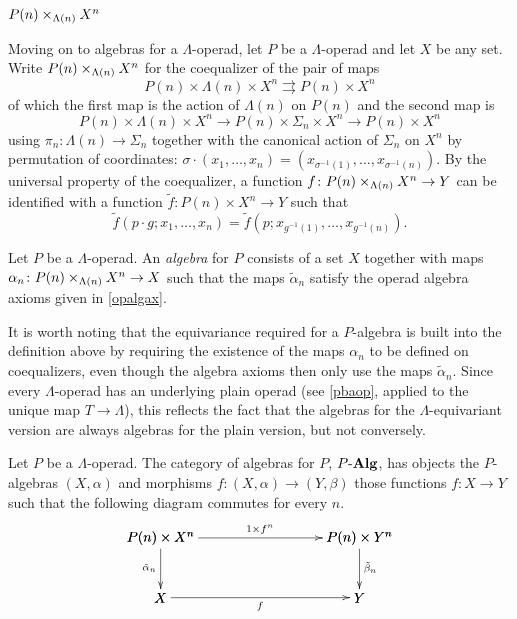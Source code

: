 $P(n) \times_{\Lambda(n)} X^{n}$

Moving on to algebras for a $\Lambda$-operad, let $P$ be a $\Lambda$-operad and let $X$ be any set. Write $P(n) \times_{\Lambda(n)} X^{n}$ for the coequalizer of the pair of maps
  \[
    P(n) \times \Lambda(n) \times X^{n} \rightrightarrows P(n) \times X^{n}
  \]
of which the first map is the action of $\Lambda(n)$ on $P(n)$ and the second map is
  \[
    P(n) \times \Lambda(n) \times X^{n} \rightarrow P(n) \times \Sigma_{n} \times X^{n} \rightarrow P(n) \times X^{n}
  \]
using $\pi_{n} \colon \Lambda(n) \rightarrow \Sigma_{n}$ together with the canonical action of $\Sigma_{n}$ on $X^{n}$ by permutation of coordinates: $\sigma \cdot (x_{1}, \ldots, x_{n}) = (x_{\sigma^{-1}(1)}, \ldots, x_{\sigma^{-1}(n)})$. By the universal property of the coequalizer, a function $f \colon P(n) \times_{\Lambda(n)} X^{n} \rightarrow Y$ can be identified with a function $\tilde{f} \colon P(n) \times X^{n} \rightarrow Y$ such that
  \[
    \tilde{f}(p\cdot g; x_{1}, \ldots, x_{n}) = \tilde{f}\left(p; x_{g^{-1}(1)}, \ldots, x_{g^{-1}(n)}\right).
  \]

\begin{Defi}
  Let $P$ be a $\Lambda$-operad. An \textit{algebra} for $P$ consists of a set $X$ together with maps $\alpha_{n} \colon P(n) \times_{\Lambda(n)} X^{n} \rightarrow X$ such that the maps $\tilde{\alpha}_{n}$ satisfy the operad algebra axioms given in \cref{opalgax}.
\end{Defi}

\begin{rem}
It is worth noting that the equivariance required for a $P$-algebra is built into the definition above by requiring the existence of the maps $\alpha_{n}$ to be defined on coequalizers, even though the algebra axioms then only use the maps $\tilde{\alpha}_{n}$. Since every $\Lambda$-operad has an underlying plain operad (see \cref{pbaop}, applied to the unique map $T \rightarrow \Lambda$), this reflects the fact that the algebras for the $\Lambda$-equivariant version are always algebras for the plain version, but not conversely.
\end{rem}

\begin{Defi}
Let $P$ be a $\Lambda$-operad. The category of algebras for $P$, $P\mbox{-}\mathbf{Alg}$, has objects the $P$-algebras $(X, \alpha)$ and morphisms $f \colon  (X, \alpha) \rightarrow (Y, \beta)$ those functions $f \colon X \rightarrow Y$ such that the following diagram commutes for every $n$.
  \[
    \xy
      {\ar^{1 \times f^{n}} (0,0)*+{P(n) \times X^{n}}; (50,0)*+{P(n) \times Y^{n}} };
      {\ar^{\tilde{\beta}_{n}} (50,0)*+{P(n) \times Y^{n}}; (50,-15)*+{Y} };
      {\ar_{\tilde{\alpha}_{n}} (0,0)*+{P(n) \times X^{n}}; (0,-15)*+{X} };
      {\ar_{f} (0,-15)*+{X}; (50,-15)*+{Y} };
    \endxy
  \]

\end{Defi}

